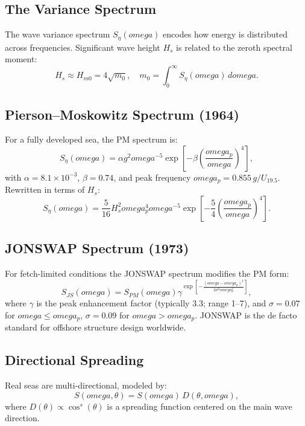 \documentclass[journal,10pt,twocolumn]{IEEEtran}
\def\omega{omega}%
\def\text#1{#1}%
\def\cdot{}%
\begin{document}
\subsection{The Variance Spectrum}
The wave variance spectrum $S_\eta(\omega)$ encodes how energy is distributed across
frequencies.
Significant wave height $H_s$ is related to the zeroth spectral moment:
\begin{equation}
  H_s \approx H_{m0} = 4\sqrt{m_0}, \quad
  m_0 = \int_0^\infty S_\eta(\omega)\,d\omega.
\end{equation}

\subsection{Pierson--Moskowitz Spectrum (1964)}
For a fully developed sea, the PM spectrum is:
\begin{equation}
  S_\eta(\omega) = \alpha g^2\omega^{-5}
    \exp\!\left[-\beta\!\left(\frac{\omega_p}{\omega}\right)^{\!4}\right],
\end{equation}
with $\alpha=8.1\times10^{-3}$, $\beta=0.74$, and peak frequency
$\omega_p = 0.855\,g/U_{19.5}$.
Rewritten in terms of $H_s$:
\begin{equation}
  S_\eta(\omega) = \frac{5}{16}H_s^2\omega_p^4\omega^{-5}
    \exp\!\left[-\frac{5}{4}\!\left(\frac{\omega_p}{\omega}\right)^{\!4}\right].
\end{equation}

\subsection{JONSWAP Spectrum (1973)}
For fetch-limited conditions the JONSWAP spectrum modifies the PM form:
\begin{equation}
  S_{\text{JS}}(\omega) = S_{\text{PM}}(\omega)\cdot
    \gamma^{\exp\!\left[-\frac{(\omega-\omega_p)^2}{2\sigma^2\omega_p^2}\right]},
\end{equation}
where $\gamma$ is the peak enhancement factor (typically 3.3; range 1--7), and
$\sigma=0.07$ for $\omega\le\omega_p$, $\sigma=0.09$ for $\omega>\omega_p$.
JONSWAP is the de facto standard for offshore structure design worldwide.

\subsection{Directional Spreading}
Real seas are multi-directional, modeled by:
\begin{equation}
  S(\omega,\theta) = S(\omega)\,D(\theta,\omega),
\end{equation}
where $D(\theta)\propto\cos^s(\theta)$ is a spreading function centered on the main
wave direction.
\end{document}
